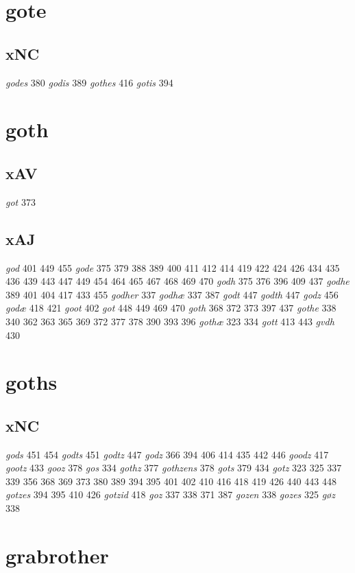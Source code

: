 \documentclass[a4paper,twocolumn]{article}
\begin{document}
\section{gote}
\label{sec:orgb50d6b1}
\subsection{xNC}
\label{sec:org48882da}
\emph{godes} 380 \emph{godis} 389 \emph{gothes} 416 \emph{gotis} 394 
\section{goth}
\label{sec:org9fc46a5}
\subsection{xAV}
\label{sec:org9cc93f0}
\emph{got} 373 
\subsection{xAJ}
\label{sec:org7eeb15e}
\emph{god} 401 449 455 \emph{gode} 375 379 388 389 400 411 412 414 419 422 424 426 434 435 436 439 443 447 449 454 464 465 467 468 469 470 \emph{godh} 375 376 396 409 437 \emph{godhe} 389 401 404 417 433 455 \emph{godher} 337 \emph{godhæ} 337 387 \emph{godt} 447 \emph{godth} 447 \emph{godz} 456 \emph{godæ} 418 421 \emph{goot} 402 \emph{got} 448 449 469 470 \emph{goth} 368 372 373 397 437 \emph{gothe} 338 340 362 363 365 369 372 377 378 390 393 396 \emph{gothæ} 323 334 \emph{gott} 413 443 \emph{gvdh} 430 
\section{goths}
\label{sec:org7396674}
\subsection{xNC}
\label{sec:org0a4ac56}
\emph{gods} 451 454 \emph{godts} 451 \emph{godtz} 447 \emph{godz} 366 394 406 414 435 442 446 \emph{goodz} 417 \emph{gootz} 433 \emph{gooz} 378 \emph{gos} 334 \emph{gothz} 377 \emph{gothzens} 378 \emph{gots} 379 434 \emph{gotz} 323 325 337 339 356 368 369 373 380 389 394 395 401 402 410 416 418 419 426 440 443 448 \emph{gotzes} 394 395 410 426 \emph{gotzid} 418 \emph{goz} 337 338 371 387 \emph{gozen} 338 \emph{gozes} 325 \emph{gøz} 338 
\section{grabrother}
\label{sec:org6342faa}
\end{document}
